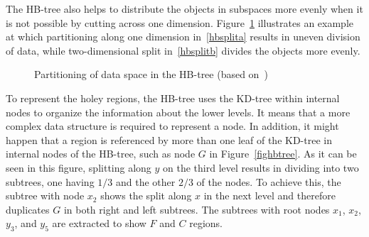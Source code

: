 \documentclass[a4paper,12pt]{article}
\begin{document}
The HB-tree also helps to distribute the objects in subspaces more evenly when it is not possible by cutting across one dimension. Figure~\ref{hbtree} illustrates an example at which partitioning along one dimension in~\ref{hbsplita} results in uneven division of data, while two-dimensional split in~\ref{hbsplitb} divides the objects more evenly.

\begin{figure}
\centering
{}
\centering
{}
\caption{Partitioning of data space in the HB-tree (based on~\cite{tree-basedindexes})}
\label{hbtree}
\end{figure}

To represent the holey regions, the HB-tree uses the KD-tree within internal nodes to organize the information about the lower levels. It means that a more complex data structure is required to represent a node. In addition, it might happen that a region is referenced by more than one leaf of the KD-tree in internal nodes of the HB-tree, such as node $G$ in Figure~\ref{fighbtree}. As it can be seen in this figure, splitting along $y$ on the third level results in dividing into two subtrees, one having $1/3$ and the other $2/3$ of the nodes. To achieve this, the subtree with node $x_2$ shows the split along $x$ in the next level and therefore duplicates $G$ in both right and left subtrees. The subtrees with root nodes $x_1$, $x_2$, $y_3$, and $y_5$ are extracted to show $F$ and $C$ regions.
\end{document}

